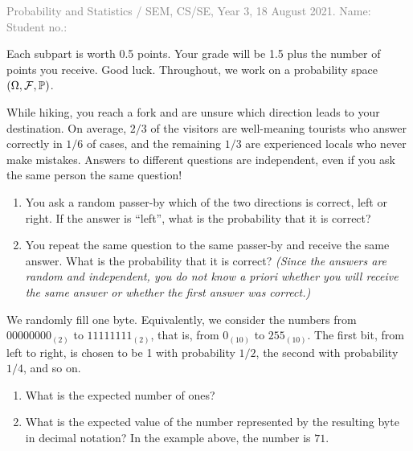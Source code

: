 \documentclass[a4paper]{report}
\begin{document}
\noindent \textcolor{gray}{Probability and Statistics / SEM, CS/SE, Year 3, 18 August 2021. Name:}
\hfill \textcolor{gray}{Student no.:\qquad\qquad}
\hrulefill
\begin{it}
Each subpart is worth 0.5 points. Your grade will be 1.5 plus the number of points you receive. Good luck.
Throughout, we work on a probability space $(\Omega,{\mathcal{F}},\mathbb P)$.
\end{it}
\begin{problem}
While hiking, you reach a fork and are unsure which direction leads to your destination. On average, $2/3$ of the visitors are well-meaning tourists who answer correctly in $1/6$ of cases, and the remaining $1/3$ are experienced locals who never make mistakes.
Answers to different questions are independent, even if you ask the same person the same question!
\begin{enumerate}
\item You ask a random passer-by which of the two directions is correct, left or right. If the answer is ``left'', what is the probability that it is correct?
\item You repeat the same question to the same passer-by and receive the same answer. What is the probability that it is correct? \textit{(Since the answers are random and independent, you do not know a priori whether you will receive the same answer or whether the first answer was correct.)}
\end{enumerate}
\end{problem}
\begin{problem}
We randomly fill one byte. Equivalently, we consider the numbers from $00000000_{(2)}$ to $11111111_{(2)}$, that is, from $0_{(10)}$ to $255_{(10)}$. The first bit, from left to right, is chosen to be 1 with probability $1/2$, the second with probability $1/4$, and so on.
\begin{center}
\end{center}
\begin{enumerate}
\item What is the expected number of ones?
\item What is the expected value of the number represented by the resulting byte in decimal notation? In the example above, the number is $71$.
\end{enumerate}
\end{problem}
\end{document}
